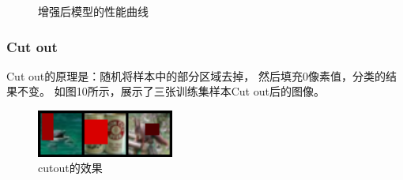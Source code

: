 \documentclass[UTF8]{ctexart}
\begin{document}
\begin{figure}[htbp]
    \centering
    \hspace{0.5in}
    \hspace{0.5in}
    \caption{增强后模型的性能曲线}
\end{figure}

\subsubsection{Cut out}
Cut out的原理是：随机将样本中的部分区域去掉，
然后填充0像素值，分类的结果不变。
如图10所示，展示了三张训练集样本Cut out后的图像。

\begin{figure}[htbp]
    \centering
    \includegraphics[width=0.40\textwidth]{../img/sample_cutout.png}
    \caption{cutout的效果}
\end{figure}
\end{document}
